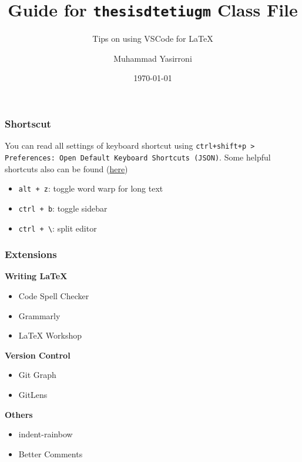 \documentclass{beamer}
\title{Guide for \texttt{thesisdtetiugm} Class File}
\subtitle{Tips on using VSCode for LaTeX}
\author{Muhammad Yasirroni}
\institute{Universitas Gadjah Mada}
\date{\today}
\begin{document}
\begin{frame}
  \titlepage
\end{frame}

\begin{frame}[fragile]
  \frametitle{Shortscut}

  You can read all settings of keyboard shortcut using \texttt{ctrl+shift+p > Preferences: Open Default Keyboard Shortcuts (JSON)}. Some helpful shortcuts also can be found (\href{https://gist.github.com/bradtraversy/b28a0a361880141af928ada800a671d9}{here})
  \begin{itemize}
    \item \texttt{alt + z}: toggle word warp for long text
    \item \texttt{ctrl + b}: toggle sidebar
    \item \verb|ctrl + \|: split editor
  \end{itemize}
\end{frame}

\begin{frame}
    \frametitle{Extensions}

    \textbf{Writing LaTeX}
    \begin{itemize}
      \item Code Spell Checker
      \item Grammarly
      \item LaTeX Workshop
    \end{itemize}

    \textbf{Version Control}
    \begin{itemize}
        \item Git Graph
        \item GitLens
    \end{itemize}

    \textbf{Others}
    \begin{itemize}
        \item indent-rainbow
        \item Better Comments
    \end{itemize}

\end{frame}
\end{document}
